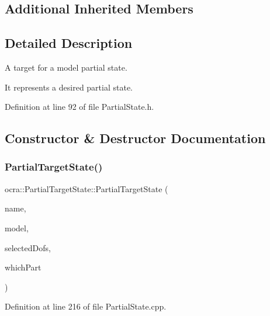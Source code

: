 \subsection*{Additional Inherited Members}


\subsection{Detailed Description}
A target for a model partial state. 

It represents a desired partial state. 

Definition at line 92 of file Partial\+State.\+h.



\subsection{Constructor \& Destructor Documentation}
\hypertarget{classocra_1_1PartialTargetState_a2aed8d7e02fa12907eb218449afc6422}{}\label{classocra_1_1PartialTargetState_a2aed8d7e02fa12907eb218449afc6422} 
\subsubsection{\texorpdfstring{Partial\+Target\+State()}{PartialTargetState()}}
{\footnotesize\ttfamily ocra\+::\+Partial\+Target\+State\+::\+Partial\+Target\+State (\begin{DoxyParamCaption}\item[{const std\+::string \&}]{name,  }\item[{const Model \&}]{model,  }\item[{const Eigen\+::\+Vector\+Xi \&}]{selected\+Dofs,  }\item[{int}]{which\+Part }\end{DoxyParamCaption})}



Definition at line 216 of file Partial\+State.\+cpp.

\hypertarget{classocra_1_1PartialTargetState_a32d63501a917b40728387258cb1e06d1}{}\label{classocra_1_1PartialTargetState_a32d63501a917b40728387258cb1e06d1} 
